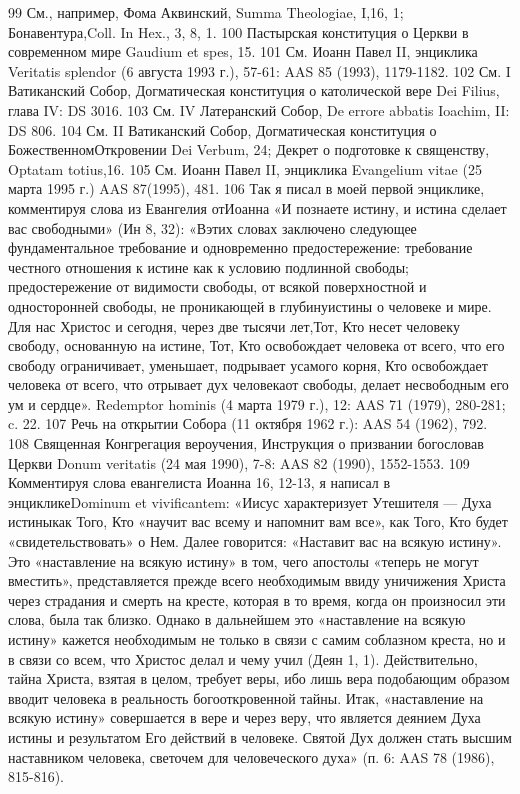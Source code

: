 \documentclass[a5paper,10pt]{article}
\begin{document}
99 См., например, Фома Аквинский, Summa Theologiae, I,16, 1; Бонавентура,Coll. In Hex., 3, 8, 1.
100 Пастырская конституция о Церкви в современном мире Gaudium et spes, 15.
101 См. Иоанн Павел II, энциклика Veritatis splendor (6 августа 1993 г.), 57-61: AAS 85 (1993), 1179-1182.
102 См. I Ватиканский Собор, Догматическая конституция о католической вере Dei Filius, глава IV: DS 3016.
103 См. IV Латеранский Собор, De errore abbatis Ioachim, II: DS 806.
104 См. II Ватиканский Собор, Догматическая конституция о БожественномОткровении Dei Verbum, 24; Декрет о подготовке к священству, Optatam totius,16.
105 См. Иоанн Павел II, энциклика Evangelium vitae (25 марта 1995 г.) AAS 87(1995), 481.
106 Так я писал в моей первой энциклике, комментируя слова из Евангелия отИоанна «И познаете истину, и истина сделает вас свободными» (Ин 8, 32): «Вэтих словах заключено следующее фундаментальное требование и одновременно предостережение: требование честного отношения к истине как к условию подлинной свободы; предостережение от видимости свободы, от всякой поверхностной и односторонней свободы, не проникающей в глубинуистины о человеке и мире. Для нас Христос и сегодня, через две тысячи лет,Тот, Кто несет человеку свободу, основанную на истине, Тот, Кто освобождает человека от всего, что его свободу ограничивает, уменьшает, подрывает усамого корня, Кто освобождает человека от всего, что отрывает дух человекаот свободы, делает несвободным его ум и сердце». Redemptor hominis (4 марта 1979 г.), 12: AAS 71 (1979), 280-281; c. 22.
107 Речь на открытии Собора (11 октября 1962 г.): AAS 54 (1962), 792.
108 Священная Конгрегация вероучения, Инструкция о призвании богословав Церкви Donum veritatis (24 мая 1990), 7-8: AAS 82 (1990), 1552-1553.
109 Комментируя слова евангелиста Иоанна 16, 12-13, я написал в энцикликеDominum et vivificantem: «Иисус характеризует Утешителя — Духа истиныкак Того, Кто «научит вас всему и напомнит вам все», как Того, Кто будет «свидетельствовать» о Нем. Далее говорится: «Наставит вас на всякую истину». Это «наставление на всякую истину» в том, чего апостолы «теперь не могут вместить», представляется прежде всего необходимым ввиду уничижения Христа через страдания и смерть на кресте, которая в то время, когда он произносил эти слова, была так близко. Однако в дальнейшем это «наставление на всякую истину» кажется необходимым не только в связи с самим соблазном креста, но и в связи со всем, что Христос делал и чему учил (Деян 1, 1). Действительно, тайна Христа, взятая в целом, требует веры, ибо лишь вера подобающим образом вводит человека в реальность богооткровенной тайны. Итак, «наставление на всякую истину» совершается в вере и через веру, что является деянием Духа истины и результатом Его действий в человеке. Святой Дух должен стать высшим наставником человека, светочем для человеческого духа» (п. 6: AAS 78 (1986), 815-816).
\end{document}

